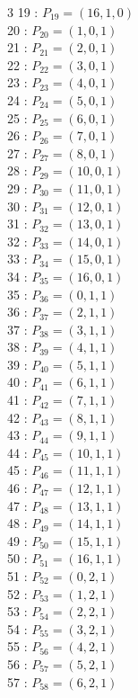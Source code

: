 \documentclass{article}
\begin{document}
{\begin{multicols}{3}
19 : $P_{19}=( 16, 1, 0 )$\\
20 : $P_{20}=( 1, 0, 1 )$\\
21 : $P_{21}=( 2, 0, 1 )$\\
22 : $P_{22}=( 3, 0, 1 )$\\
23 : $P_{23}=( 4, 0, 1 )$\\
24 : $P_{24}=( 5, 0, 1 )$\\
25 : $P_{25}=( 6, 0, 1 )$\\
26 : $P_{26}=( 7, 0, 1 )$\\
27 : $P_{27}=( 8, 0, 1 )$\\
28 : $P_{29}=( 10, 0, 1 )$\\
29 : $P_{30}=( 11, 0, 1 )$\\
30 : $P_{31}=( 12, 0, 1 )$\\
31 : $P_{32}=( 13, 0, 1 )$\\
32 : $P_{33}=( 14, 0, 1 )$\\
33 : $P_{34}=( 15, 0, 1 )$\\
34 : $P_{35}=( 16, 0, 1 )$\\
35 : $P_{36}=( 0, 1, 1 )$\\
36 : $P_{37}=( 2, 1, 1 )$\\
37 : $P_{38}=( 3, 1, 1 )$\\
38 : $P_{39}=( 4, 1, 1 )$\\
39 : $P_{40}=( 5, 1, 1 )$\\
40 : $P_{41}=( 6, 1, 1 )$\\
41 : $P_{42}=( 7, 1, 1 )$\\
42 : $P_{43}=( 8, 1, 1 )$\\
43 : $P_{44}=( 9, 1, 1 )$\\
44 : $P_{45}=( 10, 1, 1 )$\\
45 : $P_{46}=( 11, 1, 1 )$\\
46 : $P_{47}=( 12, 1, 1 )$\\
47 : $P_{48}=( 13, 1, 1 )$\\
48 : $P_{49}=( 14, 1, 1 )$\\
49 : $P_{50}=( 15, 1, 1 )$\\
50 : $P_{51}=( 16, 1, 1 )$\\
51 : $P_{52}=( 0, 2, 1 )$\\
52 : $P_{53}=( 1, 2, 1 )$\\
53 : $P_{54}=( 2, 2, 1 )$\\
54 : $P_{55}=( 3, 2, 1 )$\\
55 : $P_{56}=( 4, 2, 1 )$\\
56 : $P_{57}=( 5, 2, 1 )$\\
57 : $P_{58}=( 6, 2, 1 )$\\

\end{multicols}}
\end{document}
